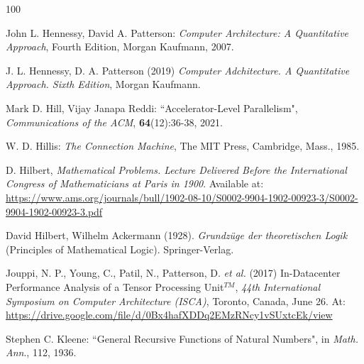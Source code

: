 \begin{thebibliography}{100}


 John L. Hennessy, David A. Patterson: {\em Computer Architecture: A Quantitative Approach}, Fourth Edition, Morgan Kaufmann, 2007.

 J. L. Hennessy, D. A. Patterson (2019) {\it Computer Adchitecture. A Quantitative Approach. Sixth Edition}, Morgan Kaufmann.



 Mark D. Hill, Vijay Janapa Reddi: ``Accelerator-Level Parallelism", {\em Communications of the ACM}, {\bf 64}(12):36-38, 2021.

 W. D. Hillis: {\em The Connection Machine}, The MIT Press, Cambridge, Mass., 1985.

 D. Hilbert, {\em Mathematical Problems. Lecture Delivered Before the International Congress of Mathematicians at Paris in 1900}.    Available at:  \url{https://www.ams.org/journals/bull/1902-08-10/S0002-9904-1902-00923-3/S0002-9904-1902-00923-3.pdf}

    David Hilbert, Wilhelm Ackermann (1928). {\em Grundzüge der theoretischen Logik} (Principles of Mathematical Logic). Springer-Verlag.



  Jouppi, N. P., Young, C., Patil, N., Patterson, D. {\em et al.} (2017) In-Datacenter Performance Analysis of a Tensor Processing Unit$^{TM}$, {\em 44th International Symposium on Computer Architecture (ISCA)}, Toronto, Canada, June 26.
    At: \url{https://drive.google.com/file/d/0Bx4hafXDDq2EMzRNcy1vSUxtcEk/view}

 Stephen C. Kleene: ``General Recursive Functions of
 Natural Numbers", in {\em Math. Ann}., 112, 1936.


\end{thebibliography}
